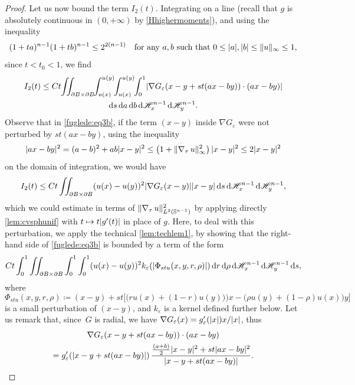 \documentclass[JEP,XML,SOM,Unicode,published]{cedram}
\numberwithin{equation}{section}
\theoremstyle{plain}
\theoremstyle{definition}
\newcommand{\dd}{\mathop{}\mathopen{}\mathrm{d}}
\newcommand{\da}{\mathop{}\mathopen{}\mathrm{d}a}
\newcommand{\db}{\mathop{}\mathopen{}\mathrm{d}b}
\newcommand{\dr}{\mathop{}\mathopen{}\mathrm{d}r}
\newcommand{\ds}{\mathop{}\mathopen{}\mathrm{d}s}
\newcommand{\dH}{\mathop{}\mathopen{}\mathrm{d}\mathscr{H}}
\newcommand{\bbS}{\mathbb{S}}
\let\eps\varepsilon
\newcommand{\grad}{\nabla}
\DeclarePairedDelimiter{\abs}{\lvert}{\rvert}
\DeclarePairedDelimiter{\norm}{\lVert}{\rVert}
\begin{document}
\begin{proof}
Let us now bound the term $I_2(t)$. Integrating on a line (recall that $g$ is absolutely continuous
in $(0,+\infty)$ by \cref{Hhighermoments}), and using the inequality
\[
(1+ta)^{n-1}(1+tb)^{n-1}\leq 2^{2(n-1)}\quad\text{for any $a,b$ such that $0\leq \abs{a},\abs{b}\leq \norm{u}_\infty\leq 1$},
\]
since $t<t_0<1$, we find
\begin{multline}\label{fuglede:eq3b}
I_2(t)\leq Ct\hspace{-2pt}\iint_{\partial B\times\partial B}\hspace{-3pt}
\int_{u(x)}^{u(y)}\hspace{-3pt}\int_{u(x)}^{u(y)}\hspace{-3pt} \int_0^1\abs{\grad
G_\eps(x-y+st(ax-by))\cdot(ax-by)} \\\dd s\da\db\dH_x^{n-1}\dH_y^{n-1}.
\end{multline}
Observe that in \cref{fuglede:eq3b}, if the term $(x-y)$ inside $\grad G_\eps$ were not
perturbed by $st(ax-by)$, using the inequality
\begin{equation}\label{fuglede:eq3c}
\abs{ax-by}^2 = (a-b)^2+ab\abs{x-y}^2\leq \left(1+\norm{\grad_\tau\,
u}_\infty^2\right)\abs{x-y}^2\leq
2\abs{x-y}^2
\end{equation}
on the domain of integration, we would have
\[
I_2(t)\leq Ct\iint_{\partial B\times\partial B}
(u(x)-u(y))^2\abs{\grad G_\eps(x-y)}\abs{x-y} \dd s\dH_x^{n-1}\dH_y^{n-1},
\]
which we could estimate in terms of $\norm{\grad_\tau\, u}^2_{L^2(\bbS^{n-1})}$ by applying directly
\cref{lem:cvsphunif} with $t\mapsto t\abs{g'(t)}$ in place of $g$.
Here, to deal with this perturbation, we apply the technical \cref{lem:techlem1}, by showing
that the right-hand side of \cref{fuglede:eq3b} is bounded by a term of the form
\[
Ct\int_0^1 \iint_{\partial B\times\partial B}\int_0^1\int_0^1 (u(x)-u(y))^2
k_\eps(\abs{\Phi_{stu}(x,y,r,\rho)})\dr\dd\rho\dH^{n-1}_x\dH^{n-1}_y\ds,
\]
where
\begin{equation}\label{fuglede:defPhi}
\Phi_{stu}(x,y,r,\rho)\coloneqq(x-y)+st\bigl[\big(ru(x)+(1-r)u(y))\big)x-
\big(\rho u(y)+(1-\rho)u(x)\big)y\bigr]
\end{equation}
is a small perturbation of $(x-y)$, and $k_\eps$ is a kernel defined further below.
Let us remark that, since~$G$ is radial, we have $\grad
G_\eps(x)=g_\eps'(\abs{x})x/\abs{x}$, thus
\begin{multline}\label{fuglede:eq4b}
\grad G_\eps(x-y+st(ax-by))\cdot(ax-by)\\
=g_\eps'(\abs{x-y+st(ax-by)})\,\frac{\frac{(a+b)}{2}\abs{x-y}^2+st\abs{ax-by}^2}{\abs{x-y+st(ax-by)}}.

\end{multline}
\end{proof}
\end{document}
